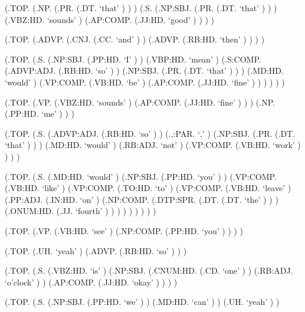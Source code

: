 \documentclass[10pt]{article}
\begin{document}
\begin{parsetree}  (.TOP. (.NP. (.PR. (.DT. `that' ) ) ) (.S. (.NP:SBJ. (.PR. (.DT. `that' ) ) ) (.VBZ:HD. `sounds' ) (.AP:COMP. (.JJ:HD. `good' ) ) ) ) \end{parsetree}

\begin{parsetree}  (.TOP. (.ADVP. (.CNJ. (.CC. `and' ) ) (.ADVP. (.RB:HD. `then' ) ) ) ) \end{parsetree}

\begin{parsetree}  (.TOP. (.S. (.NP:SBJ. (.PP:HD. `I' ) ) (.VBP:HD. `mean' ) (.S:COMP. (.ADVP:ADJ. (.RB:HD. `so' ) ) (.NP:SBJ. (.PR. (.DT. `that' ) ) ) (.MD:HD. `would' ) (.VP:COMP. (.VB:HD. `be' ) (.AP:COMP. (.JJ:HD. `fine' ) ) ) ) ) ) \end{parsetree}

\begin{parsetree}  (.TOP. (.VP. (.VBZ:HD. `sounds' ) (.AP:COMP. (.JJ:HD. `fine' ) ) ) (.NP. (.PP:HD. `me' ) ) ) \end{parsetree}

\begin{parsetree}  (.TOP. (.S. (.ADVP:ADJ. (.RB:HD. `so' ) ) (.,:PAR. `,' ) (.NP:SBJ. (.PR. (.DT. `that' ) ) ) (.MD:HD. `would' ) (.RB:ADJ. `not' ) (.VP:COMP. (.VB:HD. `work' ) ) ) ) \end{parsetree}

\begin{parsetree}  (.TOP. (.S. (.MD:HD. `would' ) (.NP:SBJ. (.PP:HD. `you' ) ) (.VP:COMP. (.VB:HD. `like' ) (.VP:COMP. (.TO:HD. `to' ) (.VP:COMP. (.VB:HD. `leave' ) (.PP:ADJ. (.IN:HD. `on' ) (.NP:COMP. (.DTP:SPR. (.DT. (.DT. `the' ) ) ) (.ONUM:HD. (.JJ. `fourth' ) ) ) ) ) ) ) ) ) \end{parsetree}

\begin{parsetree}  (.TOP. (.VP. (.VB:HD. `see' ) (.NP:COMP. (.PP:HD. `you' ) ) ) ) \end{parsetree}

\begin{parsetree}  (.TOP. (.UH. `yeah' ) (.ADVP. (.RB:HD. `so' ) ) ) \end{parsetree}

\begin{parsetree}  (.TOP. (.S. (.VBZ:HD. `is' ) (.NP:SBJ. (.CNUM:HD. (.CD. `one' ) ) (.RB:ADJ. `o'clock' ) ) (.AP:COMP. (.JJ:HD. `okay' ) ) ) ) \end{parsetree}

\begin{parsetree}  (.TOP. (.S. (.NP:SBJ. (.PP:HD. `we' ) ) (.MD:HD. `can' ) ) (.UH. `yeah' ) ) \end{parsetree}
\end{document}
